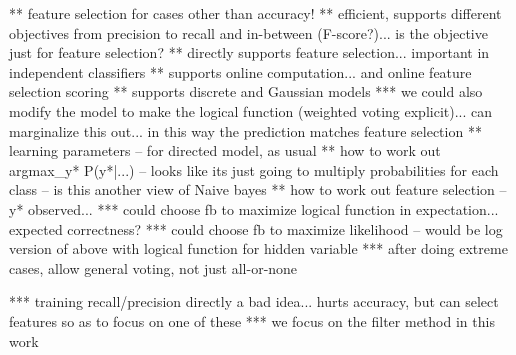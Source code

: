 ** feature selection for cases other than accuracy!
** efficient, supports different objectives from precision to recall and in-between (F-score?)... is the objective just for feature 
selection?
** directly supports feature selection... important in independent classifiers
** supports online computation... and online feature selection scoring
** supports discrete and Gaussian models
*** we could also modify the model to make the logical function (weighted voting explicit)... can marginalize this out... in this way the 
prediction matches feature selection
** learning parameters -- for directed model, as usual
** how to work out argmax_y* P(y*|...) -- looks like its just going to multiply probabilities for each class -- is this another view of 
Naive bayes
** how to work out feature selection -- y* observed...
*** could choose fb to maximize logical function in expectation... expected correctness?
*** could choose fb to maximize likelihood -- would be log version of above with logical function for hidden variable
*** after doing extreme cases, allow general voting, not just all-or-none

*** training recall/precision directly a bad idea... hurts accuracy, but can select features so as to focus on one of these
*** we focus on the filter method in this work
\ENDCOMMENT

